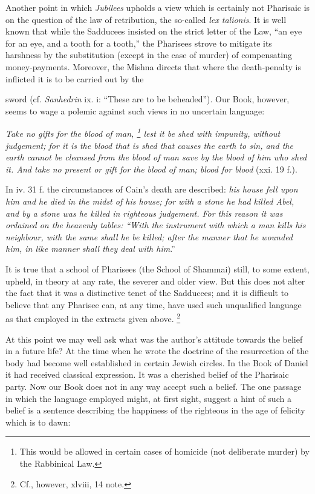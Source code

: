 Another point in which \emph{Jubilees} upholds a view which is certainly not Pharisaic is on the question of the law of retribution, the so-called \emph{lex talionis}. It is well known that while the Sadducees insisted on the strict letter of the Law, ``an eye for an eye, and a tooth for a tooth,'' the Pharisees strove to mitigate its harshness by the substitution (except in the case of murder) of compensating money-payments. Moreover, the Mishna directs that where the death-penalty is inflicted it is to be carried out by the

sword (cf. \emph{Sanhedrin} ix. i: ``These are to be beheaded''). Our Book, however, seems to wage a polemic against such views in no uncertain language:

\emph{Take no gifts for the blood of man, \footnote{This would be allowed in certain cases of homicide (not deliberate murder) by the Rabbinical Law.} lest it be shed with impunity, without judgement; for it is the blood that is shed that causes the earth to sin, and the earth cannot be cleansed from the blood of man save by the blood of him who shed it. And take no present or gift for the blood of man; blood for blood} (xxi. 19 f.).

In iv. 31 f. the circumstances of Cain's death are described: \emph{his house fell upon him and he died in the midst of his house; for with a stone he had killed Abel, and by a stone was he killed in righteous judgement. For this reason it was ordained on the heavenly tables: ``With the instrument with which a man kills his neighbour, with the same shall he be killed; after the manner that he wounded him, in like manner shall they deal with him}.''

It is true that a school of Pharisees (the School of Shammai) still, to some extent, upheld, in theory at any rate, the severer and older view. But this does not alter the fact that it was a distinctive tenet of the Sadducees; and it is difficult to believe that any Pharisee can, at any time, have used such unqualified language as that employed in the extracts given above. \footnote{Cf., however, xlviii, 14 note.}

At this point we may well ask what was the author's attitude towards the belief in a future life? At the time when he wrote the doctrine of the resurrection of the body had become well established in certain Jewish circles. In the Book of Daniel it had received classical expression. It was a cherished belief of the Pharisaic party. Now our Book does not in any way accept such a belief. The one passage in which the language employed might, at first sight, suggest a hint of such a belief is a sentence describing the happiness of the righteous in the age of felicity which is to dawn:

